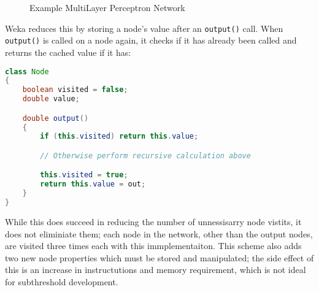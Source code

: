 \begin{figure}[!h]
    \centering
    \caption{Example MultiLayer Perceptron Network}
    \label{fig:eg-ml}
\end{figure}

Weka reduces this by storing a node's value after an \verb|output()| call. When \verb|output()| is called on a node again, it checks if it has already been called and returns the cached value if it has:

\begin{lstlisting}[language=Java,caption={Weka's method of preventing repeated calculations}]
class Node
{
    boolean visited = false;
    double value;

    double output()
    {
        if (this.visited) return this.value;

        // Otherwise perform recursive calculation above

        this.visited = true;
        return this.value = out;
    }
}
\end{lstlisting}

While this does succeed in reducing the number of unnessisarry node vistits, it does not eliminiate them; each node in the network, other than the output nodes, are visited three times each with this immplementaiton. This scheme also adds two new node properties which must be stored and manipulated; the side effect of this is an increase in instructutions and memory requirement, which is not ideal for subthreshold development.

